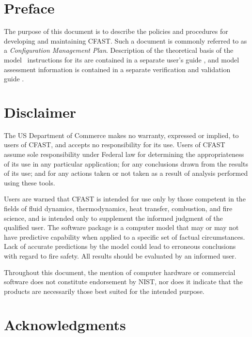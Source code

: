 \documentclass[12pt]{book}
\begin{document}
\newpage

\frontmatter

\pagestyle{plain}
\setcounter{page}{3}




\chapter{Preface}

The purpose of this document is to describe the policies and procedures for developing and maintaining CFAST. Such a document is commonly referred to as a {\em Configuration Management Plan}. Description of the theoretical basis of the model \cite{CFAST_Tech_Guide_7}\, instructions for its are contained in a separate user's guide \cite{CFAST_Users_Guide_7}, and model assessment information is contained in a separate verification and validation guide \cite{CFAST_Valid_Guide_7}.

\chapter{Disclaimer}

The US Department of Commerce makes no warranty, expressed or implied, to users of CFAST, and accepts no responsibility for its use. Users of CFAST assume sole responsibility under Federal law for determining the appropriateness of its use in any particular application; for any conclusions drawn from the results of its use; and for any actions taken or not taken as a result of analysis performed using these tools.

Users are warned that CFAST is intended for use only by those competent in the fields of fluid dynamics, thermodynamics, heat transfer, combustion, and fire science, and is intended only to supplement the informed judgment of the qualified user. The software package is a computer model that may or may not have predictive capability when applied to a specific set of factual circumstances. Lack of accurate predictions by the model could lead to erroneous conclusions with regard to fire safety. All results should be evaluated by an informed user.

Throughout this document, the mention of computer hardware or commercial software does not constitute endorsement by NIST, nor does it indicate that the products are necessarily those best suited for the intended purpose.



\chapter{Acknowledgments}
\end{document}
